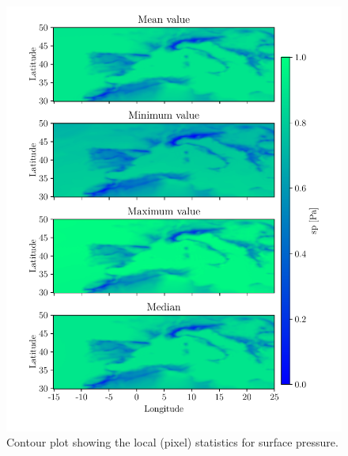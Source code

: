 \begin{figure}[ht]
    \centering
    \includegraphics{python_figs/all_stat_variable_sp.pdf}
    \caption{Contour plot showing the local (pixel) statistics for surface pressure.}
    \label{fig:all_stats_sp}
\end{figure}

